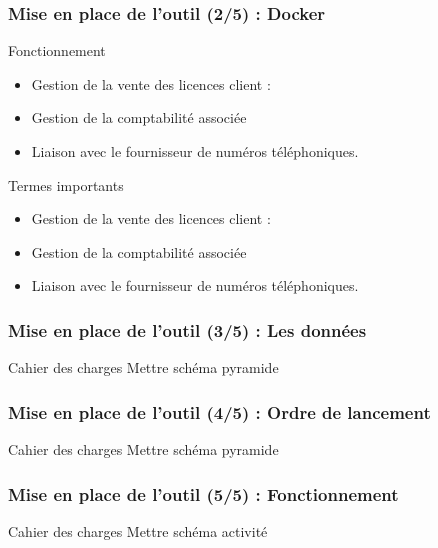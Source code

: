 \begin{frame}
	\frametitle{Mise en place de l'outil (2/5) : Docker}

    \begin{block}{Fonctionnement}
	 \begin{itemize}
	  \item Gestion de la vente des licences client :
      \item Gestion de la comptabilité associée
	  \item Liaison avec le fournisseur de numéros téléphoniques.
	 \end{itemize}
	\end{block}

	\begin{block}{Termes importants}
	 \begin{itemize}
	  \item Gestion de la vente des licences client :
      \item Gestion de la comptabilité associée
	  \item Liaison avec le fournisseur de numéros téléphoniques.
	 \end{itemize}
	\end{block}

\end{frame}

\begin{frame}
	\frametitle{Mise en place de l'outil (3/5) : Les données}

    \begin{block}{Cahier des charges}
		Mettre schéma pyramide
	\end{block}

\end{frame}

\begin{frame}
	\frametitle{Mise en place de l'outil (4/5) : Ordre de lancement}

    \begin{block}{Cahier des charges}
		Mettre schéma pyramide
	\end{block}

\end{frame}


\begin{frame}
	\frametitle{Mise en place de l'outil (5/5) : Fonctionnement}

    \begin{block}{Cahier des charges}
		Mettre schéma activité
	\end{block}

\end{frame}